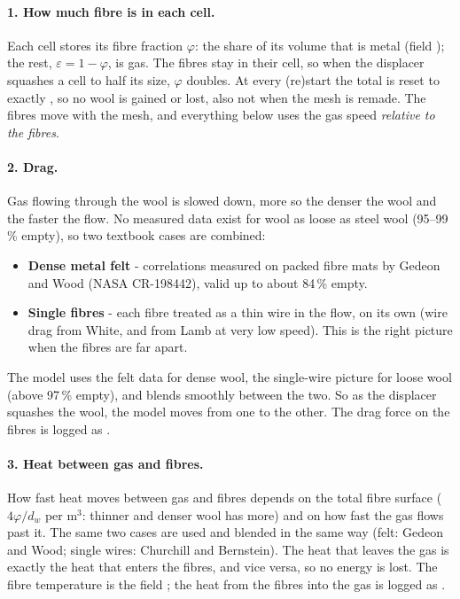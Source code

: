 \paragraph{1. How much fibre is in each cell.}
Each cell stores its fibre fraction $\varphi$: the share of its volume that is metal (field ); the rest, $\varepsilon = 1 - \varphi$, is gas. The fibres stay in their cell, so when the displacer squashes a cell to half its size, $\varphi$ doubles. At every (re)start the total is reset to exactly , so no wool is gained or lost, also not when the mesh is remade. The fibres move with the mesh, and everything below uses the gas speed \emph{relative to the fibres}.

\paragraph{2. Drag.}
Gas flowing through the wool is slowed down, more so the denser the wool and the faster the flow. No measured data exist for wool as loose as steel wool (95--99\,\% empty), so two textbook cases are combined:
\begin{itemize}
    \item \textbf{Dense metal felt} - correlations measured on packed fibre mats by Gedeon and Wood (NASA CR-198442), valid up to about 84\,\% empty.
    \item \textbf{Single fibres} - each fibre treated as a thin wire in the flow, on its own (wire drag from White, and from Lamb at very low speed). This is the right picture when the fibres are far apart.
\end{itemize}
The model uses the felt data for dense wool, the single-wire picture for loose wool (above 97\,\% empty), and blends smoothly between the two. So as the displacer squashes the wool, the model moves from one to the other. The drag force on the fibres is logged as .

\paragraph{3. Heat between gas and fibres.}
How fast heat moves between gas and fibres depends on the total fibre surface ($4\varphi/d_w$ per m$^3$: thinner and denser wool has more) and on how fast the gas flows past it. The same two cases are used and blended in the same way (felt: Gedeon and Wood; single wires: Churchill and Bernstein). The heat that leaves the gas is exactly the heat that enters the fibres, and vice versa, so no energy is lost. The fibre temperature is the field ; the heat from the fibres into the gas is logged as .


